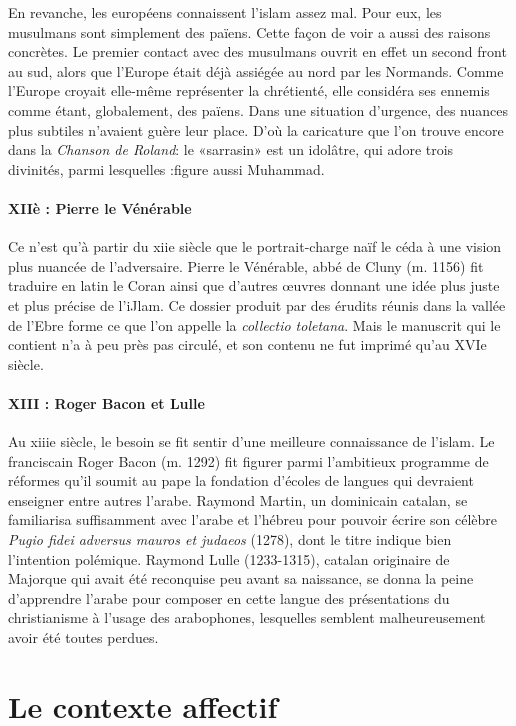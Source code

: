 En revanche, les européens connaissent l'islam assez mal. Pour eux, les musulmans sont simplement des païens. Cette façon de voir a aussi des raisons concrètes. Le premier contact avec des musulmans ouvrit en effet un second front au sud, alors que l'Europe était
déjà assiégée au nord par les Normands. Comme l'Europe croyait elle-même représenter la chrétienté, elle considéra ses ennemis comme étant, globalement, des païens. Dans une situation d'urgence, des nuances plus subtiles n'avaient guère leur place. D'où la caricature que l'on trouve encore dans la \textit{Chanson de Roland}: le «sarrasin» est un idolâtre, qui adore trois divinités, parmi lesquelles :figure aussi Muhammad.

\paragraph{XIIè : Pierre le Vénérable}
Ce n'est qu'à partir du xiie siècle que le portrait-charge naïf le céda à une vision plus nuancée de l'adversaire. Pierre le Vénérable, abbé de Cluny (m. 1156) fit traduire en latin le Coran ainsi que d'autres œuvres donnant une idée plus juste et plus précise de l'iJlam. Ce dossier produit par des érudits réunis dans la vallée de l'Ebre forme ce que l'on appelle la \textit{collectio toletana}. Mais le manuscrit qui le contient n'a à peu près pas circulé, et son contenu ne fut imprimé qu'au XVIe siècle.
\paragraph{XIII : Roger Bacon  et Lulle}
Au xiiie siècle, le besoin se fit sentir d'une meilleure connaissance de l'islam. Le franciscain Roger Bacon (m. 1292) fit figurer parmi l'ambitieux programme de réformes qu'il soumit au pape la fondation d'écoles de langues qui devraient enseigner entre autres l'arabe. Raymond Martin, un dominicain catalan, se familiarisa suffisamment avec l'arabe et l'hébreu pour pouvoir écrire son célèbre \textit{Pugio fidei adversus mauros et judaeos} (1278), dont le titre indique bien l'intention polémique. Raymond Lulle (1233-1315), catalan originaire de Majorque qui avait été reconquise peu avant sa naissance, se donna la peine d'apprendre l'arabe pour composer en cette langue des présentations du christianisme à l'usage des arabophones, lesquelles semblent malheureusement avoir été toutes perdues.



\section{Le contexte affectif}

